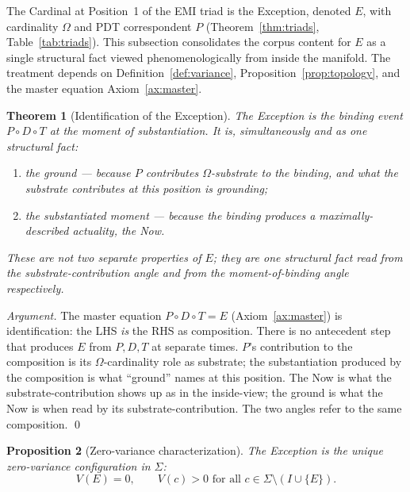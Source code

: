 \documentclass[11pt,a4paper]{article}
\newtheorem{theorem}{Theorem}[section]
\newtheorem{proposition}[theorem]{Proposition}
\theoremstyle{definition}
\theoremstyle{remark}
\begin{document}
The Cardinal at Position~1 of the EMI triad is the Exception, denoted $E$, with cardinality $\Omega$ and PDT correspondent $P$ (Theorem~\ref{thm:triads}, Table~\ref{tab:triads}). This subsection consolidates the corpus content for $E$ as a single structural fact viewed phenomenologically from inside the manifold. The treatment depends on Definition~\ref{def:variance}, Proposition~\ref{prop:topology}, and the master equation Axiom~\ref{ax:master}.

\begin{theorem}[Identification of the Exception]\label{thm:exception-identification}
The Exception is the binding event $P\circ D\circ T$ at the moment of substantiation. It is, simultaneously and as one structural fact:
\begin{enumerate}[label=(\roman*),leftmargin=*]
\item the \emph{ground} --- because $P$ contributes $\Omega$-substrate to the binding, and what the substrate contributes at this position is grounding;
\item the \emph{substantiated moment} --- because the binding produces a maximally-described actuality, the Now.
\end{enumerate}
These are not two separate properties of $E$; they are one structural fact read from the substrate-contribution angle and from the moment-of-binding angle respectively.
\end{theorem}

\begin{proof}[Argument]
The master equation $P \circ D \circ T = E$ (Axiom~\ref{ax:master}) is identification: the LHS \emph{is} the RHS as composition. There is no antecedent step that produces $E$ from $P,D,T$ at separate times. $P$'s contribution to the composition is its $\Omega$-cardinality role as substrate; the substantiation produced by the composition is what ``ground'' names at this position. The Now is what the substrate-contribution shows up as in the inside-view; the ground is what the Now is when read by its substrate-contribution. The two angles refer to the same composition. \qed
\end{proof}

\begin{proposition}[Zero-variance characterization]\label{prop:E-zero-variance}
The Exception is the unique zero-variance configuration in $\Sigma$:
\[
V(E) = 0, \qquad V(c) > 0 \text{ for all } c \in \Sigma\setminus(I\cup\{E\}).
\]
\end{proposition}
\end{document}
